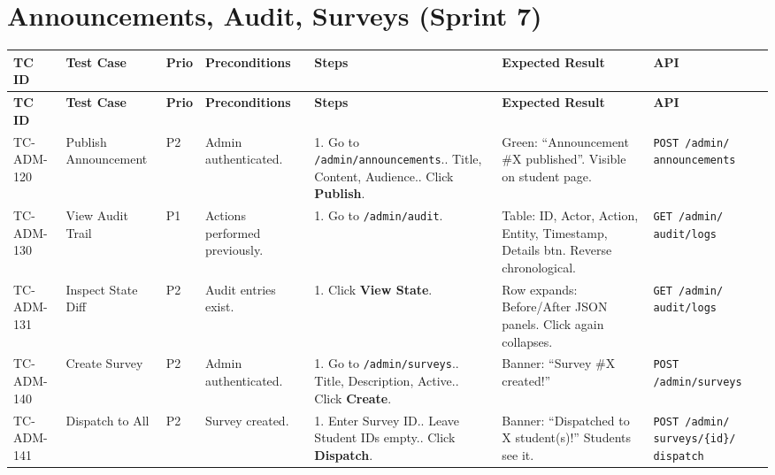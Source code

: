 \documentclass[12pt,a4paper]{article}
\begin{document}
\section{Announcements, Audit, Surveys (Sprint 7)}

\begin{longtable}{L{2cm} L{3cm} L{1cm} L{4cm} L{5.5cm} L{5.5cm} L{3cm}}
\toprule
\textbf{TC ID} & \textbf{Test Case} & \textbf{Prio} & \textbf{Preconditions} & \textbf{Steps} & \textbf{Expected Result} & \textbf{API} \\
\midrule
\endfirsthead \toprule \textbf{TC ID} & \textbf{Test Case} & \textbf{Prio} & \textbf{Preconditions} & \textbf{Steps} & \textbf{Expected Result} & \textbf{API} \\ \midrule \endhead \bottomrule \endfoot

TC-ADM-120 & Publish Announcement & P2 & Admin authenticated. & 1. Go to \texttt{/admin/announcements}.. Title, Content, Audience.. Click \textbf{Publish}. & Green: ``Announcement \#X published''. Visible on student page. & \texttt{POST /admin/ announcements} \\
\midrule
TC-ADM-130 & View Audit Trail & P1 & Actions performed previously. & 1. Go to \texttt{/admin/audit}. & Table: ID, Actor, Action, Entity, Timestamp, Details btn. Reverse chronological. & \texttt{GET /admin/ audit/logs} \\
\midrule
TC-ADM-131 & Inspect State Diff & P2 & Audit entries exist. & 1. Click \textbf{View State}. & Row expands: Before/After JSON panels. Click again collapses. & \texttt{GET /admin/ audit/logs} \\
\midrule
TC-ADM-140 & Create Survey & P2 & Admin authenticated. & 1. Go to \texttt{/admin/surveys}.. Title, Description, Active.. Click \textbf{Create}. & Banner: ``Survey \#X created!'' & \texttt{POST /admin/surveys} \\
\midrule
TC-ADM-141 & Dispatch to All & P2 & Survey created. & 1. Enter Survey ID.. Leave Student IDs empty.. Click \textbf{Dispatch}. & Banner: ``Dispatched to X student(s)!'' Students see it. & \texttt{POST /admin/ surveys/\{id\}/ dispatch} \\
\end{longtable}
\end{document}
